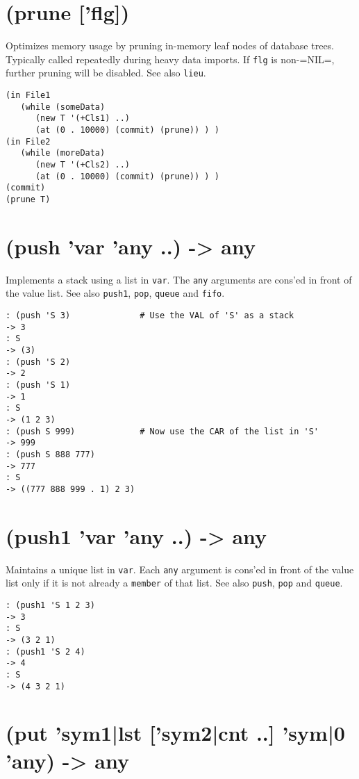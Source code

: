 {{{{{{{{ 
\section{(prune ['flg])}
\label{sec-8-1-16-42}


Optimizes memory usage by pruning in-memory leaf nodes of database
trees. Typically called repeatedly during heavy data imports. If \texttt{flg}
is non-=NIL=, further pruning will be disabled. See also \texttt{lieu}.


\begin{verbatim}
(in File1
   (while (someData)
      (new T '(+Cls1) ..)
      (at (0 . 10000) (commit) (prune)) ) )
(in File2
   (while (moreData)
      (new T '(+Cls2) ..)
      (at (0 . 10000) (commit) (prune)) ) )
(commit)
(prune T)
\end{verbatim}

 
\section{(push 'var 'any ..) -> any}
\label{sec-8-1-16-43}


Implements a stack using a list in \texttt{var}. The \texttt{any} arguments are
cons'ed in front of the value list. See also \texttt{push1}, \texttt{pop}, \texttt{queue} and
\texttt{fifo}.


\begin{verbatim}
: (push 'S 3)              # Use the VAL of 'S' as a stack
-> 3
: S
-> (3)
: (push 'S 2)
-> 2
: (push 'S 1)
-> 1
: S
-> (1 2 3)
: (push S 999)             # Now use the CAR of the list in 'S'
-> 999
: (push S 888 777)
-> 777
: S
-> ((777 888 999 . 1) 2 3)
\end{verbatim}

 
\section{(push1 'var 'any ..) -> any}
\label{sec-8-1-16-44}


Maintains a unique list in \texttt{var}. Each \texttt{any} argument is cons'ed in
front of the value list only if it is not already a \texttt{member} of that
list. See also \texttt{push}, \texttt{pop} and \texttt{queue}.


\begin{verbatim}
: (push1 'S 1 2 3)
-> 3
: S
-> (3 2 1)
: (push1 'S 2 4)
-> 4
: S
-> (4 3 2 1)
\end{verbatim}

 
\section{(put 'sym1|lst ['sym2|cnt ..] 'sym|0 'any) -> any}
\label{sec-8-1-16-45}


}}}}}}}}
